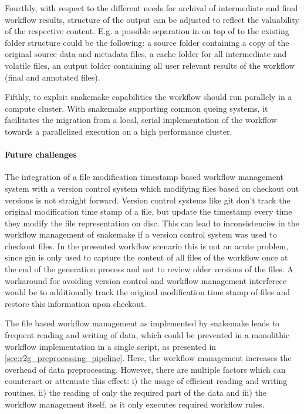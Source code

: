 Fourthly, with respect to the different needs for archival of intermediate and final workflow results, structure of the output can be adjusted to reflect the valuability of the respective content. E.g. a possible separation in on top of to the existing folder structure could be the following: a source folder containing a copy of the original source data and metadata files, a cache folder for all intermediate and volatile files, an output folder containing all user relevant results of the workflow (final  and annotated  files).

Fifthly, to exploit snakemake capabilities the workflow should run parallely in a compute cluster. With snakemake supporting common queing systems, it facilitates the migration from a local, serial implementation of the workflow towards a parallelized execution on a high performance cluster.

\paragraph{Future challenges}
The integration of a file modification timestamp based workflow management system with a version control system which modifying files based on checkout out versions is not straight forward. Version control systems like git don't track the original modification time stamp of a file, but update the timestamp every time they modify the file representation on disc. This can lead to inconsistencies in the workflow management of snakemake if a version control system was used to checkout files. In the presented workflow scenario this is not an acute problem, since gin is only used to capture the content of all files of the workflow once at the end of the generation process and not to review older versions of the files. A workaround for avoiding version control and workflow management interferece would be to additionally track the original modification time stamp of files and restore this information upon checkout.

The file based workflow management as implemented by snakemake leads to frequent reading and writing of data, which could be prevented in a monolithic workflow implementation in a single script, as presented in \cref{sec:r2g_preprocessing_pipeline}. Here, the workflow management increases the overhead of data preprocessing. However, there are multiple factors which can counteract or attenuate this effect: i) the usage of efficient reading and writing routines, ii) the reading of only the required part of the data and iii) the workflow management itself, as it only executes required workflow rules.

